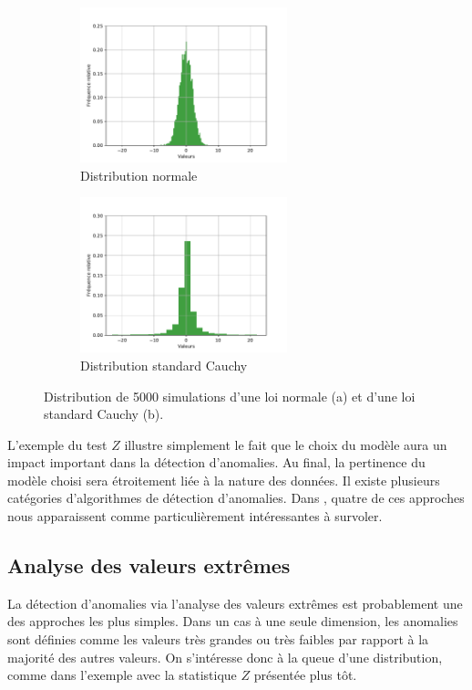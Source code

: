 \begin{figure}[htb]
	\centering
	\begin{subfigure}{6cm}
		\centering\includegraphics[width=6cm]{images/histogram-normal-ztest}
		\caption{Distribution normale}
		\label{fig:Ztest_a}
	\end{subfigure}
	\begin{subfigure}{6cm}
		\centering\includegraphics[width=6cm]{images/histogram-cauchy-ztest}
		\caption{Distribution standard Cauchy}
		\label{fig:Ztest_b}
	\end{subfigure}
	\caption{Distribution de 5000 simulations d'une loi normale (a) et d'une loi standard Cauchy (b).}
	\label{fig:ZTest}
\end{figure}

L'exemple du test $Z$ illustre simplement le fait que le choix du modèle aura un impact important dans la détection d'anomalies. Au final, la pertinence du modèle choisi sera étroitement liée à la nature des données. Il existe plusieurs catégories d'algorithmes de détection d'anomalies. Dans \cite{10.5555/3086742}, quatre de ces approches nous apparaissent comme particulièrement intéressantes à survoler.

\subsection{Analyse des valeurs extrêmes}

La détection d'anomalies via l'analyse des valeurs extrêmes est probablement une des approches les plus simples. Dans un cas à une seule dimension, les anomalies sont définies comme les valeurs très grandes ou très faibles par rapport à la majorité des autres valeurs. On s'intéresse donc à la queue d'une distribution, comme dans l'exemple avec la statistique $Z$ présentée plus tôt. 

